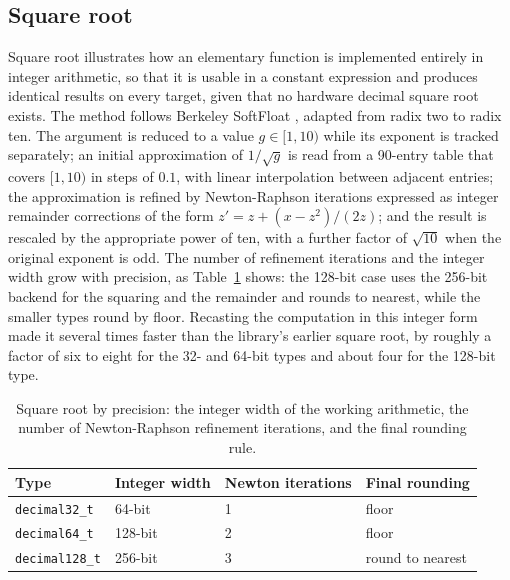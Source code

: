 \documentclass[acmsmall]{acmart}
\begin{document}
\subsection{Square root}
\label{sec:sqrt}
Square root illustrates how an elementary function is implemented entirely in integer
arithmetic, so that it is usable in a constant expression and produces identical results
on every target, given that no hardware decimal square root exists. The method follows
Berkeley SoftFloat \cite{softfloat}, adapted from radix two to radix ten. The argument is
reduced to a value $g \in [1, 10)$ while its exponent is tracked separately; an initial
approximation of $1/\sqrt{g}$ is read from a 90-entry table that covers $[1, 10)$ in
steps of $0.1$, with linear interpolation between adjacent entries; the approximation is
refined by Newton-Raphson iterations expressed as integer remainder corrections of the
form $z' = z + (x - z^2)/(2z)$; and the result is rescaled by the appropriate power of
ten, with a further factor of $\sqrt{10}$ when the original exponent is odd. The number
of refinement iterations and the integer width grow with precision, as
Table~\ref{tab:sqrt} shows: the 128-bit case uses the 256-bit backend for the squaring
and the remainder and rounds to nearest, while the smaller types round by floor.
Recasting the computation in this integer form made it several times faster than the
library's earlier square root, by roughly a factor of six to eight for the 32- and
64-bit types and about four for the 128-bit type.

\begin{table}
  \caption{Square root by precision: the integer width of the working arithmetic, the
    number of Newton-Raphson refinement iterations, and the final rounding rule.}
  \label{tab:sqrt}
  \footnotesize
  \begin{tabular}{llll}
    \toprule
    Type & Integer width & Newton iterations & Final rounding \\
    \midrule
    \texttt{decimal32\_t}  & 64-bit  & 1 & floor \\
    \texttt{decimal64\_t}  & 128-bit & 2 & floor \\
    \texttt{decimal128\_t} & 256-bit & 3 & round to nearest \\
    \bottomrule
  \end{tabular}
\end{table}
\end{document}

